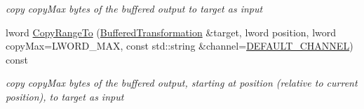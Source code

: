 \begin{DoxyCompactItemize}
\begin{DoxyCompactList}\small\item\em copy copyMax bytes of the buffered output to target as input \item\end{DoxyCompactList}\item 
\hypertarget{class_buffered_transformation_a1483b2879a70d26d0de568dd6081bb7b}{
lword \hyperlink{class_buffered_transformation_a1483b2879a70d26d0de568dd6081bb7b}{CopyRangeTo} (\hyperlink{class_buffered_transformation}{BufferedTransformation} \&target, lword position, lword copyMax=LWORD\_\-MAX, const std::string \&channel=\hyperlink{cryptlib_8h_a6f1917f54ea8c2a45de6e08c5087c8de}{DEFAULT\_\-CHANNEL}) const }
\label{class_buffered_transformation_a1483b2879a70d26d0de568dd6081bb7b}

\begin{DoxyCompactList}\small\item\em copy copyMax bytes of the buffered output, starting at position (relative to current position), to target as input \item\end{DoxyCompactList}\end{DoxyCompactItemize}
